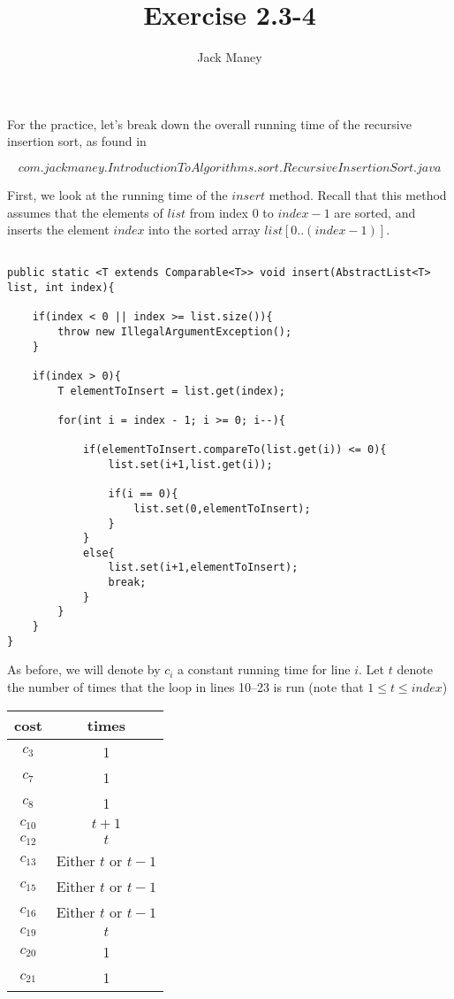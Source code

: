 \documentclass{article}
\begin{document}
\title{Exercise 2.3-4}
\author{Jack Maney}
\maketitle

For the practice, let's break down the overall running time of the recursive insertion sort, as found in

\[
	com.jackmaney.IntroductionToAlgorithms.sort.RecursiveInsertionSort.java
\]


First, we look at the running time of the $insert$ method. Recall that this method assumes that the elements of $list$ from index 0 to $index - 1$ are sorted, and inserts the element $index$ into the sorted array $list[0..(index - 1)]$.

\begin{verbatim}

public static <T extends Comparable<T>> void insert(AbstractList<T> list, int index){
		
	if(index < 0 || index >= list.size()){
		throw new IllegalArgumentException();
	}
	
	if(index > 0){
		T elementToInsert = list.get(index);
		
		for(int i = index - 1; i >= 0; i--){
			
			if(elementToInsert.compareTo(list.get(i)) <= 0){
				list.set(i+1,list.get(i));
				
				if(i == 0){
					list.set(0,elementToInsert);
				}
			}
			else{
				list.set(i+1,elementToInsert);
				break;
			}
		}
	}
}

\end{verbatim}

As before, we will denote by $c_i$ a constant running time for line $i$. Let $t$ denote the number of times that the loop in lines 10--23 is run (note that $1\leq t \leq index$)

\begin{tabular}{|c|c|}
\hline 
cost & times \\ 
\hline 
$c_3$ & 1 \\ 
\hline 
$c_7$ & 1 \\ 
\hline 
$c_8$ & 1 \\ 
\hline 
$c_{10}$ & $t+1$ \\ 
\hline 
$c_{12}$ & $t$ \\ 
\hline 
$c_{13}$ & Either $t$ or $t-1$ \\ 
\hline 
$c_{15}$ & Either $t$ or $t-1$ \\ 
\hline 
$c_{16}$ & Either $t$ or $t-1$ \\ 
\hline 
$c_{19}$ & $t$ \\
\hline
$c_{20}$ & 1 \\ 
\hline 
$c_{21}$ & 1 \\ 
\hline 
\end{tabular} 
\end{document}
